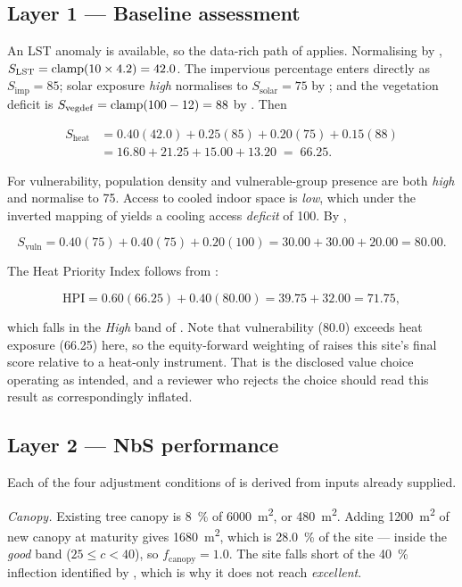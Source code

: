 \subsection{Layer 1 --- Baseline assessment}

An LST anomaly is available, so the data-rich path of
 applies. Normalising by ,
$S_{\mathrm{LST}} = \operatorname{clamp}\!\left(10 \times 4.2\right) = 42.0$. The impervious percentage
enters directly as $S_{\mathrm{imp}} = 85$; solar exposure \emph{high}
normalises to $S_{\mathrm{solar}} = 75$ by ; and the
vegetation deficit is $S_{\mathrm{vegdef}} = \operatorname{clamp}\!\left(100 - 12\right) = 88$ by
. Then

\begin{align*}
S_{\mathrm{heat}}
&= 0.40(42.0) + 0.25(85) + 0.20(75) + 0.15(88) \\
&= 16.80 + 21.25 + 15.00 + 13.20 \;=\; \mathbf{66.25}.
\end{align*}

For vulnerability, population density and vulnerable-group presence are both
\emph{high} and normalise to 75. Access to cooled indoor space is \emph{low},
which under the inverted mapping of  yields a cooling access
\emph{deficit} of 100. By ,

\[
S_{\mathrm{vuln}} = 0.40(75) + 0.40(75) + 0.20(100)
                  = 30.00 + 30.00 + 20.00 = \mathbf{80.00}.
\]

The Heat Priority Index follows from :

\[
\mathrm{HPI} = 0.60(66.25) + 0.40(80.00) = 39.75 + 32.00 = \mathbf{71.75},
\]

which falls in the \emph{High} band of . Note that
vulnerability (80.0) exceeds heat exposure (66.25) here, so the equity-forward
weighting of  raises this site's final score
relative to a heat-only instrument. That is the disclosed value choice
operating as intended, and a reviewer who rejects the choice should read this
result as correspondingly inflated.

\subsection{Layer 2 --- NbS performance}

Each of the four adjustment conditions of  is derived from
inputs already supplied.

\emph{Canopy.} Existing tree canopy is \SI{8}{\percent} of
\qty{6000}{\metre\squared}, or \qty{480}{\metre\squared}. Adding
\qty{1200}{\metre\squared} of new canopy at maturity gives
\qty{1680}{\metre\squared}, which is \SI{28.0}{\percent} of the site --- inside
the \emph{good} band ($25 \le c < 40$), so $f_{\mathrm{canopy}} = 1.0$. The site
falls short of the \SI{40}{\percent} inflection identified by
\textcite{ziter2019}, which is why it does not reach \emph{excellent}.

